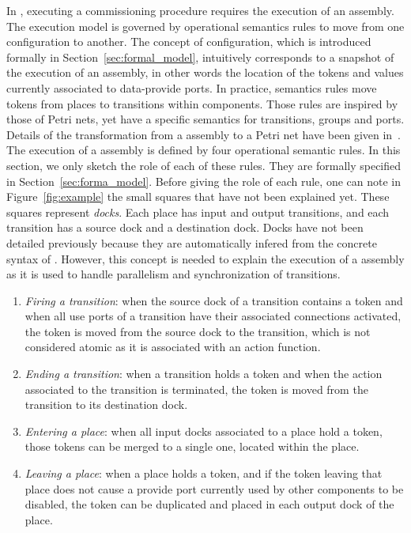 In \mad, executing a commissioning procedure requires the execution of an
assembly. The \mad execution model is governed by operational
semantics rules to move from one configuration to another. The concept
of configuration, which is introduced formally in
Section~\ref{sec:formal_model}, intuitively corresponds to a snapshot
of the execution of an assembly, in other words the location of the
tokens and values currently associated to data-provide ports. In
practice, semantics rules move tokens from places to transitions within
components. Those rules are inspired by those of Petri nets, yet have
a specific semantics for transitions, groups and ports. Details of the
transformation from a \mad assembly to a Petri net have been given
in~\cite{coullon:hal-02323641}. The execution of a \mad assembly is
defined by four operational semantic rules. In this section, we only
sketch the role of each of these rules. They are formally specified in
Section~\ref{sec:forma_model}. Before giving the role of each rule,
one can note in Figure~\ref{fig:example} the small squares that have
not been explained yet. These squares represent \emph{docks}. Each
place has input and output transitions, and each transition has a
source dock and a destination dock. Docks have not been detailed
previously because they are automatically infered from the concrete
syntax of \mad. However, this concept is needed to explain the
execution of a \mad assembly as it is used to handle parallelism and
synchronization of transitions.
%
\begin{enumerate}
\item \emph{Firing a transition}: when the source dock of a transition
  contains a token and when all use ports of a transition have their
  associated connections activated, the token is moved from the source
  dock to the transition, which is not considered atomic as it is
  associated with an action function.
\item \emph{Ending a transition}: when a transition holds a token and
  when the action associated to the transition is terminated, the
  token is moved from the transition to its destination dock.
\item \emph{Entering a place}: when all input docks associated to a
  place hold a token, those tokens can be merged to a single one, located
  within the place.
\item \emph{Leaving a place}: when a place holds a token, and if the
  token leaving that place does not cause a provide port currently
  used by other components to be disabled,
  the token can be duplicated and placed in each output dock of the
  place.
\end{enumerate}

